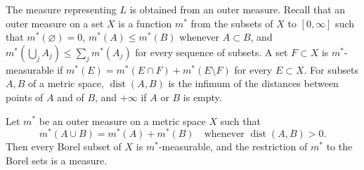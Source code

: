 The measure representing $L$ is obtained from an outer measure. Recall that an outer measure on a set $X$ is a function $m^*$ from the subsets of $X$ to $[0,\infty]$ such that $m^*(\varnothing)=0$, $m^*(A)\leq m^*(B)$ whenever $A\subset B$, and $m^*(\bigcup_jA_j)\leq\sum_jm^*(A_j)$ for every sequence of subsets. A set $F\subset X$ is $m^*$-measurable if $m^*(E)=m^*(E\cap F)+m^*(E\setminus F)$ for every $E\subset X$. For subsets $A,B$ of a metric space, $\operatorname{dist}(A,B)$ is the infimum of the distances between points of $A$ and of $B$, and $+\infty$ if $A$ or $B$ is empty.

\begin{lemma}\label{lem:metric-outer-measure}
Let $m^*$ be an outer measure on a metric space $X$ such that
\[
 m^*(A\cup B)=m^*(A)+m^*(B)\quad\text{whenever }\operatorname{dist}(A,B)>0.
\]
Then every Borel subset of $X$ is $m^*$-measurable, and the restriction of $m^*$ to the Borel sets is a measure.
\end{lemma}
